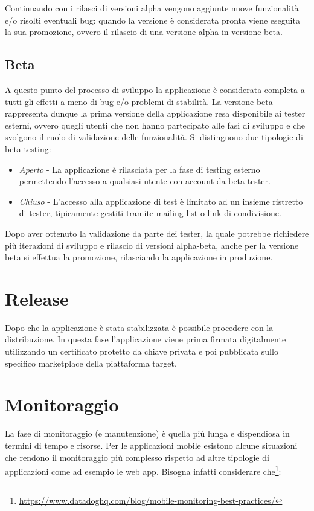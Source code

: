 Continuando con i rilasci di versioni alpha vengono aggiunte nuove funzionalità e/o risolti eventuali bug: quando la versione è considerata pronta viene eseguita la sua promozione, ovvero il rilascio di una versione alpha in versione beta.

\subsection{Beta}
A questo punto del processo di sviluppo la applicazione è considerata completa a tutti gli effetti a meno di bug e/o problemi di stabilità. La versione beta rappresenta dunque la prima versione della applicazione resa disponibile ai tester esterni, ovvero quegli utenti che non hanno partecipato alle fasi di sviluppo e che svolgono il ruolo di validazione delle funzionalità. Si distinguono due tipologie di beta testing:

\begin{itemize}
    \item \textit{Aperto} - La applicazione è rilasciata per la fase di testing esterno permettendo l'accesso a qualsiasi utente con account da beta tester.
    \item \textit{Chiuso} - L'accesso alla applicazione di test è limitato ad un insieme ristretto di tester, tipicamente gestiti tramite mailing list o link di condivisione.
\end{itemize}

Dopo aver ottenuto la validazione da parte dei tester, la quale potrebbe richiedere più iterazioni di sviluppo e rilascio di versioni alpha-beta, anche per la versione beta si effettua la promozione, rilasciando la applicazione in produzione.

\section{Release}
Dopo che la applicazione è stata stabilizzata è possibile procedere con la distribuzione. In questa fase l'applicazione viene prima firmata digitalmente utilizzando un certificato protetto da chiave privata e poi pubblicata sullo specifico marketplace della piattaforma target.

\section{Monitoraggio}
La fase di monitoraggio (e manutenzione) è quella più lunga e dispendiosa in termini di tempo e risorse. Per le applicazioni mobile esistono alcune situazioni che rendono il monitoraggio più complesso rispetto ad altre tipologie di applicazioni come ad esempio le web app. Bisogna infatti considerare che\footnote{\href{https://www.datadoghq.com/blog/mobile-monitoring-best-practices/}{https://www.datadoghq.com/blog/mobile-monitoring-best-practices/}}:


